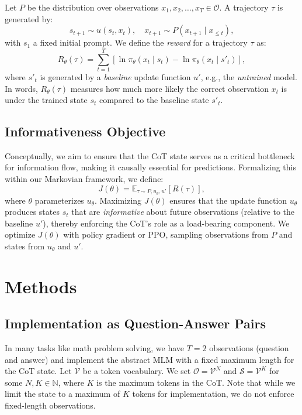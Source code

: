 \documentclass[letterpaper]{article} %
\begin{document}
Let $P$ be the distribution over observations $x_1, x_2, \dots, x_T \in \mathcal{O}$. A trajectory $\tau$ is generated by:
\[
s_{t+1}\sim u(s_t, x_t), \quad x_{t+1}\sim P(x_{t+1}\mid x_{\le t}),
\]
with $s_1$ a fixed initial prompt. We define the \emph{reward} for a trajectory $\tau$ as:
\[
R_\theta(\tau)=\sum_{t=1}^T \left[\ln \pi_\theta(x_t\mid s_t)-\ln \pi_\theta(x_t\mid s'_t)\right],
\]
where $s'_t$ is generated by a \emph{baseline} update function $u'$, e.g., the \emph{untrained} model. In words, $R_\theta(\tau)$ measures how much more likely the correct observation $x_t$ is under the trained state $s_t$ compared to the baseline state $s'_t$.

\subsection{Informativeness Objective}

Conceptually, we aim to ensure that the CoT state serves as a critical bottleneck for information flow, making it causally essential for predictions. Formalizing this within our Markovian framework, we define:
\[
  J(\theta)=\mathbb{E}_{\tau \sim P,u_\theta,u'}\left[R(\tau)\right],
\]
where $\theta$ parameterizes $u_\theta$. Maximizing $J(\theta)$ ensures that the update function $u_\theta$ produces states $s_t$ that are \emph{informative} about future observations (relative to the baseline $u'$), thereby enforcing the CoT's role as a load-bearing component. We optimize $J(\theta)$ with policy gradient or PPO, sampling observations from $P$ and states from $u_\theta$ and $u'$.

\section{Methods}
\label{sec:method}

\subsection{Implementation as Question-Answer Pairs}
In many tasks like math problem solving, we have $T=2$ observations (question and answer) and implement the abstract MLM with a fixed maximum length for the CoT state. Let $\mathcal{V}$ be a token vocabulary. We set $\mathcal{O} = \mathcal{V}^N$ and $\mathcal{S} = \mathcal{V}^K$ for some $N, K \in \mathbb{N}$, where $K$ is the maximum tokens in the CoT. Note that while we limit the state to a maximum of $K$ tokens for implementation, we do not enforce fixed-length observations. 
\end{document}
